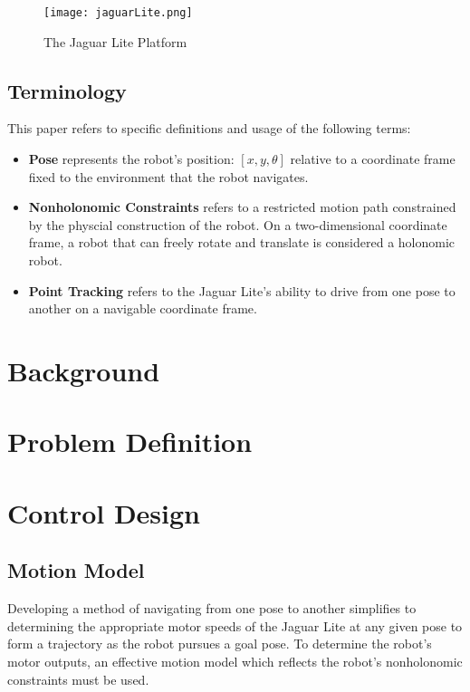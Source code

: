 \documentclass[conference]{IEEEtran}
\begin{document}
\begin{figure}[h]
\centering\texttt{[image: jaguarLite.png]}
\caption{The Jaguar Lite Platform}
\label{fig1}
\end{figure}

\subsection{Terminology}
This paper refers to specific definitions and usage of the following terms:

\begin{itemize}
\item \noindent \textbf{Pose} represents the robot's position: $[x,y,\theta]$ relative to a 
coordinate frame fixed to the environment that the robot navigates.
 
\item \noindent \textbf{Nonholonomic Constraints} refers to a restricted motion path 
constrained by the physcial construction of the robot.  On a two-dimensional coordinate 
frame, a robot that can freely
rotate and translate is considered a holonomic robot. 

\item \noindent \textbf{Point Tracking} refers to the Jaguar Lite's ability to drive
from one pose to another on a navigable coordinate frame.

\end{itemize}
\section{Background}
\section{Problem Definition}
\section{Control Design}

\subsection{Motion Model}
Developing a method of navigating from one pose to another simplifies to determining 
the appropriate motor speeds of the Jaguar Lite at any given pose to form a trajectory as the robot pursues a goal pose.  
To determine the robot's motor outputs, an effective motion model which reflects
the robot's nonholonomic constraints must be used. 
\end{document}
